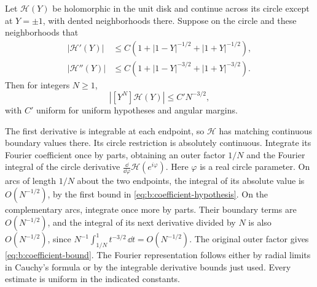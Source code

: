 \begin{lmm}\label{lmm:b:coefficient-bound}
Let $\mathcal H(Y)$ be holomorphic in the unit disk and continue
across its circle except at $Y=\pm1$, with dented neighborhoods
there. Suppose on the circle and these neighborhoods that
\begin{equation}\label{eq:b:coefficient-hypothesis}
 \begin{aligned}
 |\mathcal H'(Y)|&\leq C
       (1+|1-Y|^{-1/2}+|1+Y|^{-1/2}),\\
 |\mathcal H''(Y)|&\leq C
       (1+|1-Y|^{-3/2}+|1+Y|^{-3/2}).
 \end{aligned}
\end{equation}
Then for integers $N\geq1$,
\begin{equation}\label{eq:b:coefficient-bound}
 |[Y^N]\mathcal H(Y)|\leq C' N^{-3/2},
\end{equation}
with $C'$ uniform for uniform hypotheses and angular margins.
\end{lmm}
\begin{prf}
The first derivative is integrable at each endpoint, so
$\mathcal H$ has matching continuous boundary values there.
Its circle restriction is absolutely continuous. Integrate its
Fourier coefficient once by parts, obtaining an outer factor
$1/N$ and the Fourier integral of the circle derivative
$\frac{\dd}{\dd\varphi}\mathcal H(e^{i\varphi})$.
Here $\varphi$ is a real circle parameter. On arcs of length
$1/N$ about the two endpoints, the integral of its absolute value is
$O(N^{-1/2})$, by the first bound in
\eqref{eq:b:coefficient-hypothesis}. On the complementary arcs,
integrate once more by parts. Their boundary terms are
$O(N^{-1/2})$, and the integral of its next derivative divided by $N$ is also
$O(N^{-1/2})$, since
$N^{-1}\int_{1/N}^1t^{-3/2}\,\dd t=O(N^{-1/2})$.
The original outer factor gives \eqref{eq:b:coefficient-bound}.
The Fourier representation follows either by radial limits in
Cauchy's formula or by the integrable derivative bounds just used.
Every estimate is uniform in the indicated constants.
\end{prf}


